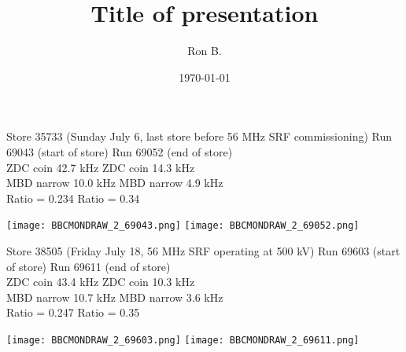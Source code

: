 \documentclass[aspectratio=169,compress,10pt]{beamer}
\title[Title of presentation]{Title of presentation}
\author[Ron B.]{Ron B.}
\institute[UNCG]{\normalsize University of North Carolina Greensboro}
\date[\today]{\today}
\begin{document}

\begin{frame}{Store 35733 (Sunday July 6, last store before 56 MHz SRF commissioning)}
Run 69043 (start of store) \hspace{3cm} Run 69052 (end of store) \\
ZDC coin 42.7 kHz \hspace{4cm} ZDC coin 14.3 kHz \\
MBD narrow 10.0 kHz \hspace{3.5cm} MBD narrow 4.9 kHz \\
Ratio = 0.234 \hspace{4.75cm} Ratio = 0.34
\begin{center}
\texttt{[image: BBCMONDRAW\_2\_69043.png]}
\texttt{[image: BBCMONDRAW\_2\_69052.png]}
\end{center}
\end{frame}

\begin{frame}{Store 38505 (Friday July 18, 56 MHz SRF operating at 500 kV)}
Run 69603 (start of store) \hspace{3cm} Run 69611 (end of store) \\
ZDC coin 43.4 kHz \hspace{4cm} ZDC coin 10.3 kHz \\
MBD narrow 10.7 kHz \hspace{3.5cm} MBD narrow 3.6 kHz \\
Ratio = 0.247 \hspace{4.75cm} Ratio = 0.35
\begin{center}
\texttt{[image: BBCMONDRAW\_2\_69603.png]}
\texttt{[image: BBCMONDRAW\_2\_69611.png]}
\end{center}
\end{frame}
\end{document}
